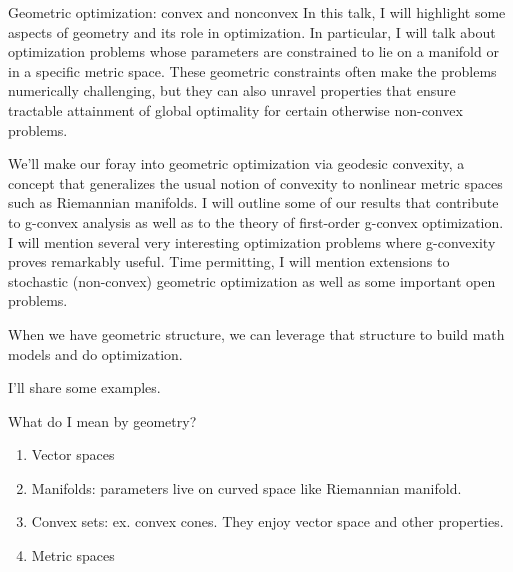 \def\filepath{C:/Users/oldhe/Dropbox/Math/templates}






\pagestyle{fancy}
\chead{} 
\lfoot{} 
\cfoot{\thepage} 
\rfoot{} 
\renewcommand{\headrulewidth}{.3pt} 
\setlength\voffset{0in}
\setlength\textheight{648pt}







\tableofcontents
Geometric optimization: convex and nonconvex 
In this talk, I will highlight some aspects of geometry and its role in optimization. In particular, I will talk about optimization problems whose parameters are constrained to lie on a manifold or in a specific metric space. These geometric constraints often make the problems numerically challenging, but they can also unravel properties that ensure tractable attainment of global optimality for certain otherwise non-convex problems.

We'll make our foray into geometric optimization via geodesic convexity, a concept that generalizes the usual notion of convexity to nonlinear metric spaces such as Riemannian manifolds. I will outline some of our results that contribute to g-convex analysis as well as to the theory of first-order g-convex optimization. I will mention several very interesting optimization problems where g-convexity proves remarkably useful. Time permitting, I will mention extensions to stochastic (non-convex) geometric optimization as well as some important open problems.

When we have geometric structure, we can leverage that structure to build math models and do optimization.


I'll share some examples.

What do I mean by geometry?
\begin{enumerate}
\item
Vector spaces
\item
Manifolds: parameters live on curved space like Riemannian manifold.
\item
Convex sets: ex. convex cones. They enjoy vector space and other properties.
\item
Metric spaces %
\end{enumerate}

